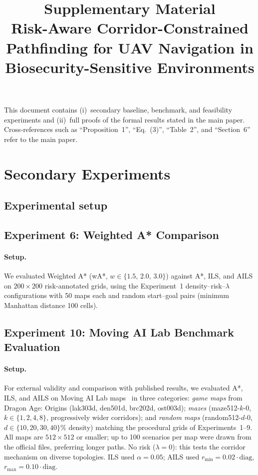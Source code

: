 \documentclass[11pt]{article}
\title{Supplementary Material\\ \large Risk-Aware Corridor-Constrained Pathfinding for UAV Navigation in Biosecurity-Sensitive Environments}
\author{}\date{}
\begin{document}
\maketitle
\noindent This document contains (i)~secondary baseline, benchmark, and feasibility experiments and (ii)~full proofs of the formal results stated in the main paper. Cross-references such as ``Proposition~1'', ``Eq.~(3)'', ``Table~2'', and ``Section~6'' refer to the main paper.

\section{Secondary Experiments}
\subsection*{Experimental setup}

\subsection{Experiment 6: Weighted A* Comparison}

\paragraph{Setup.}
We evaluated Weighted A* (wA*, $w \in \{1.5,\, 2.0,\, 3.0\}$) against A*, ILS, and AILS on $200 \times 200$ risk-annotated grids, using the Experiment~1 density--risk--$\lambda$ configurations with 50 maps each and random start--goal pairs (minimum Manhattan distance 100 cells).

\subsection{Experiment 10: Moving AI Lab Benchmark Evaluation}

\paragraph{Setup.}
For external validity and comparison with published results, we evaluated A*, ILS, and AILS on Moving AI Lab maps~\citep{Sturtevant2012} in three categories: \emph{game maps} from Dragon Age: Origins (lak303d, den501d, brc202d, ost003d); \emph{mazes} (maze512-$k$-0, $k \in \{1, 2, 4, 8\}$, progressively wider corridors); and \emph{random maps} (random512-$d$-0, $d \in \{10, 20, 30, 40\}$\% density) matching the procedural grids of Experiments~1--9. All maps are $512 \times 512$ or smaller; up to 100 scenarios per map were drawn from the official files, preferring longer paths. No risk ($\lambda = 0$): this tests the corridor mechanism on diverse topologies. ILS used $\alpha = 0.05$; AILS used $r_{\min} = 0.02 \cdot \text{diag}$, $r_{\max} = 0.10 \cdot \text{diag}$.
\end{document}
